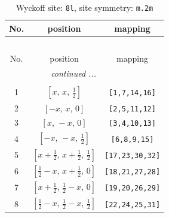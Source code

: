 \documentclass[fleqn,8pt]{jsarticle}
\begin{document}
\begin{longtable}{ccc}
\caption{Wyckoff site: {\tt 8l}, site symmetry: {\tt m.2m}}
 \\
 \hline \hline
No. & position & mapping \\ \hline \endfirsthead

\multicolumn{2}{l}{\tablename\ \thetable{}} \\
 \hline \hline
No. & position & mapping \\ \hline \endhead

 \hline \hline
\multicolumn{2}{r}{\footnotesize\it continued ...} \\ \endfoot

 \hline \hline
\multicolumn{2}{r}{} \\ \endlastfoot

1 & $\left[ x,\, x,\, \frac{1}{2} \right]$ & {\tt [1,7,14,16]} \\ \hline
2 & $\left[ - x,\, x,\, 0 \right]$ & {\tt [2,5,11,12]} \\ \hline
3 & $\left[ x,\, - x,\, 0 \right]$ & {\tt [3,4,10,13]} \\ \hline
4 & $\left[ - x,\, - x,\, \frac{1}{2} \right]$ & {\tt [6,8,9,15]} \\ \hline
5 & $\left[ x + \frac{1}{2},\, x + \frac{1}{2},\, \frac{1}{2} \right]$ & {\tt [17,23,30,32]} \\ \hline
6 & $\left[ \frac{1}{2} - x,\, x + \frac{1}{2},\, 0 \right]$ & {\tt [18,21,27,28]} \\ \hline
7 & $\left[ x + \frac{1}{2},\, \frac{1}{2} - x,\, 0 \right]$ & {\tt [19,20,26,29]} \\ \hline
8 & $\left[ \frac{1}{2} - x,\, \frac{1}{2} - x,\, \frac{1}{2} \right]$ & {\tt [22,24,25,31]} \\
\end{longtable}
\renewcommand{\arraystretch}{1.2}
\end{document}
